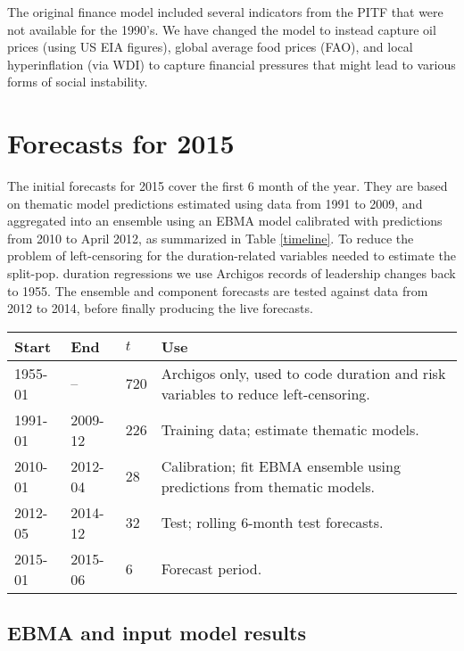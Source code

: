 \documentclass[pdftex,11pt]{article}
\begin{document}
The original finance model included several indicators from the PITF that were not available for the 1990's. We have changed the model to instead capture oil prices (using US EIA figures), global average food prices (FAO), and local hyperinflation (via WDI) to capture financial pressures that might lead to various forms of social instability. 

\section{Forecasts for 2015}

The initial forecasts for 2015 cover the first 6 month of the year. They are based on thematic model predictions estimated using data from 1991 to 2009, and aggregated into an ensemble using an EBMA model calibrated with predictions from 2010 to April 2012, as summarized in Table \ref{timeline}. To reduce the problem of left-censoring for the duration-related variables needed to estimate the split-pop. duration regressions we use Archigos records of leadership changes back to 1955. The ensemble and component forecasts are tested against data from 2012 to 2014, before finally producing the live forecasts. 

\begin{table*}[ht]
\caption{Data partitions}
\label{timeline}
\centering
\begin{tabular}{lllp{5in}}
  \toprule
  Start & End & $t$ & Use \\
  \midrule
  1955-01 & -- & 720 & Archigos only, used to code duration and risk variables to reduce left-censoring. \\
  1991-01 & 2009-12 & 226 & Training data; estimate thematic models. \\
  2010-01 & 2012-04 & 28 & Calibration; fit EBMA ensemble using predictions from thematic models. \\
  2012-05 & 2014-12 & 32 & Test; rolling 6-month test forecasts. \\
  2015-01 & 2015-06 & 6 & Forecast period. \\
   \bottomrule
\end{tabular}
\end{table*}

\subsection{EBMA and input model results}
\end{document}
